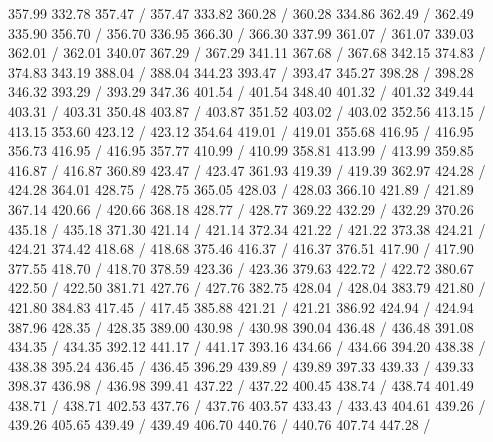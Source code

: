{ 357.99 332.78 357.47 /
 357.47 333.82 360.28 /
 360.28 334.86 362.49 /
 362.49 335.90 356.70 /
 356.70 336.95 366.30 /
 366.30 337.99 361.07 /
 361.07 339.03 362.01 /
 362.01 340.07 367.29 /
 367.29 341.11 367.68 /
 367.68 342.15 374.83 /
 374.83 343.19 388.04 /
 388.04 344.23 393.47 /
 393.47 345.27 398.28 /
 398.28 346.32 393.29 /
 393.29 347.36 401.54 /
 401.54 348.40 401.32 /
 401.32 349.44 403.31 /
 403.31 350.48 403.87 /
 403.87 351.52 403.02 /
 403.02 352.56 413.15 /
 413.15 353.60 423.12 /
 423.12 354.64 419.01 /
 419.01 355.68 416.95 /
 416.95 356.73 416.95 /
 416.95 357.77 410.99 /
 410.99 358.81 413.99 /
 413.99 359.85 416.87 /
 416.87 360.89 423.47 /
 423.47 361.93 419.39 /
 419.39 362.97 424.28 /
 424.28 364.01 428.75 /
 428.75 365.05 428.03 /
 428.03 366.10 421.89 /
 421.89 367.14 420.66 /
 420.66 368.18 428.77 /
 428.77 369.22 432.29 /
 432.29 370.26 435.18 /
 435.18 371.30 421.14 /
 421.14 372.34 421.22 /
 421.22 373.38 424.21 /
 424.21 374.42 418.68 /
 418.68 375.46 416.37 /
 416.37 376.51 417.90 /
 417.90 377.55 418.70 /
 418.70 378.59 423.36 /
 423.36 379.63 422.72 /
 422.72 380.67 422.50 /
 422.50 381.71 427.76 /
 427.76 382.75 428.04 /
 428.04 383.79 421.80 /
 421.80 384.83 417.45 /
 417.45 385.88 421.21 /
 421.21 386.92 424.94 /
 424.94 387.96 428.35 /
 428.35 389.00 430.98 /
 430.98 390.04 436.48 /
 436.48 391.08 434.35 /
 434.35 392.12 441.17 /
 441.17 393.16 434.66 /
 434.66 394.20 438.38 /
 438.38 395.24 436.45 /
 436.45 396.29 439.89 /
 439.89 397.33 439.33 /
 439.33 398.37 436.98 /
 436.98 399.41 437.22 /
 437.22 400.45 438.74 /
 438.74 401.49 438.71 /
 438.71 402.53 437.76 /
 437.76 403.57 433.43 /
 433.43 404.61 439.26 /
 439.26 405.65 439.49 /
 439.49 406.70 440.76 /
 440.76 407.74 447.28 /
}
